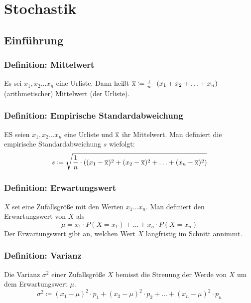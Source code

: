 \documentclass{article}
\begin{document}
  \section{Stochastik}
  
  \subsection{Einführung}
  
  \subsubsection{Definition: Mittelwert}
  Es sei $x_1, x_2 \ldots x_n$ eine Urliste. Dann heißt $\overline{\rm x} \coloneqq \frac{1}{n} \cdot (x_1 + x_2 + \ldots + x_n)$ (arithmetischer) Mittelwert (der Urliste).
  
  \subsubsection{Definition: Empirische Standardabweichung}
  ES seien $x_1,x_2 \ldots x_n$ eine Urliste und $\overline{\rm x}$ ihr Mittelwert. Man definiert die empirische Standardabweichung $s$ wiefolgt: 
  \begin{equation*}
  	s \coloneqq \sqrt{\frac{1}{n} \cdot ((x_1 - \overline{\rm x})^2 + (x_2 - \overline{\rm x})^2 + \ldots + (x_n - \overline{\rm x})^2)}
  \end{equation*}
  
  \subsubsection{Definition: Erwartungswert}
  $X$ sei eine Zufallsgröße mit den Werten $x_1 \ldots x_n$. Man definiert den Erwartungswert von $X$ als
  \begin{equation*}
  	\mu = x_1 \cdot P(X = x_1) + \ldots + x_n \cdot P(X = x_n)
  \end{equation*}
  Der Erwartungswert gibt an, welchen Wert $X$ langfristig im Schnitt annimmt.
  
  \subsubsection{Definition: Varianz}
  Die Varianz $\sigma^2$ einer Zufallsgröße $X$ bemisst die Streuung der Werde von $X$ um dem Erwartungswert $\mu$. 
  \begin{equation*}
  	\sigma^2 \coloneqq (x_1 - \mu)^2 \cdot p_1 +  (x_2 - \mu)^2 \cdot p_2 + \ldots + (x_n - \mu)^2 \cdot p_n
  \end{equation*}
  
\end{document}
